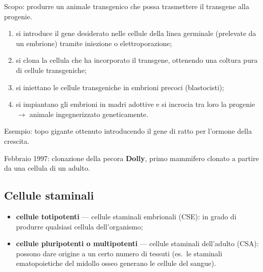 Scopo: produrre un animale transgenico che possa trasmettere il transgene alla progenie.
\begin{enumerate}
  \item si introduce il gene desiderato nelle cellule della linea germinale (prelevate da un embrione) tramite iniezione o elettroporazione;
  \item si clona la cellula che ha incorporato il transgene, ottenendo una coltura pura di cellule transgeniche;
  \item si iniettano le cellule transgeniche in embrioni precoci (blastocisti);
  \item si impiantano gli embrioni in madri adottive e si incrocia tra loro la progenie $\rightarrow$ animale ingegnerizzato geneticamente.
\end{enumerate}
Esempio: topo gigante ottenuto introducendo il gene di ratto per l'ormone della crescita.

Febbraio 1997: clonazione della pecora \textbf{Dolly}, primo mammifero clonato a partire da una cellula di un adulto.

\subsection{Cellule staminali}

\begin{itemize}
  \item \textbf{cellule totipotenti} --- cellule staminali embrionali (CSE): in grado di produrre qualsiasi cellula dell'organismo;
  \item \textbf{cellule pluripotenti o multipotenti} --- cellule staminali dell'adulto (CSA): possono dare origine a un certo numero di tessuti (es.\ le staminali ematopoietiche del midollo osseo generano le cellule del sangue).
\end{itemize}
